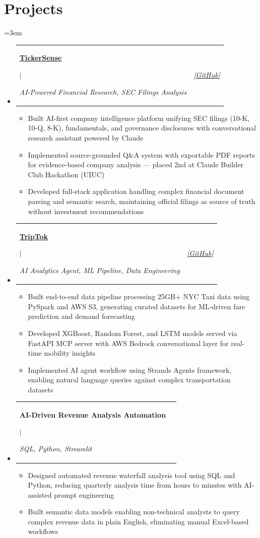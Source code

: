 \documentclass[letterpaper,11pt]{article}
\makeatletter
\newcommand{\resumeProjectHeading}[2]{
  \vspace{0pt}\item
    \begin{tabular*}{\textwidth}{l@{\extracolsep{\fill}}r}
      \textbf{#1}{ $|\$ \textit{#2}} & \\
    \end{tabular*}\vspace{-6pt}
}
\newcommand{\resumeProjectHeadingLinks}[4]{
  \vspace{0pt}\item
    \begin{tabular*}{\textwidth}{l@{\extracolsep{\fill}}r}
      \textbf{\href{\#1}{#2}}{ $|\$ \textit{#3}} & \href{\#4}{\textit{[GitHub]}} \\
    \end{tabular*}\vspace{-6pt}
}
\newcommand{\resumeSubHeadingListStart}{\begin{itemize}[leftmargin=0pt,label={},itemsep=-2pt]}
\newcommand{\resumeSubHeadingListEnd}{\end{itemize}}
\newcommand{\resumeItemListStart}{\begin{itemize}[leftmargin=12pt, nosep, topsep=2pt]}
\newcommand{\resumeItemListEnd}{\end{itemize}}
\renewcommand{\resumeProjectHeading}[2]{
  \vspace{0pt}\item
    \begin{tabular*}{\textwidth}{l@{\extracolsep{\fill}}r}
      \textbf{#1}{ $|$ \parbox[t]{0.82\textwidth}{\textit{#2}}} & \\
    \end{tabular*}\vspace{-6pt}
}
\renewcommand{\resumeProjectHeadingLinks}[4]{
  \vspace{0pt}\item
    \begin{tabular*}{\textwidth}{l@{\extracolsep{\fill}}r}
      \textbf{\href{#1}{#2}}{ $|$ \parbox[t]{0.78\textwidth}{\textit{#3}}} & \href{#4}{\textit{[GitHub]}} \\
    \end{tabular*}\vspace{-6pt}
}
\makeatother
\begin{document}
\section{Projects}
\begingroup\sloppy\emergencystretch=3em

  \resumeSubHeadingListStart
    \resumeProjectHeadingLinks
      {https://project-tickersense.vercel.app/}{TickerSense}
      {AI-Powered Financial Research, SEC Filings Analysis}
      {https://github.com/pratyushagarwal22/tickersense}
      \resumeItemListStart
        \item {Built AI-first company intelligence platform unifying SEC filings (10-K, 10-Q, 8-K), fundamentals, and governance disclosures with conversational research assistant powered by Claude}
        \item {Implemented source-grounded Q\&A system with exportable PDF reports for evidence-based company analysis — placed 2nd at Claude Builder Club Hackathon (UIUC)}
        \item {Developed full-stack application handling complex financial document parsing and semantic search, maintaining official filings as source of truth without investment recommendations}
      \resumeItemListEnd

    \resumeProjectHeadingLinks
      {https://github.com/pratyushagarwal22/TripTok}{TripTok}
      {AI Analytics Agent, ML Pipeline, Data Engineering}
      {https://github.com/pratyushagarwal22/TripTok}
      \resumeItemListStart
        \item {Built end-to-end data pipeline processing 25GB+ NYC Taxi data using PySpark and AWS S3, generating curated datasets for ML-driven fare prediction and demand forecasting}
        \item {Developed XGBoost, Random Forest, and LSTM models served via FastAPI MCP server with AWS Bedrock conversational layer for real-time mobility insights}
        \item {Implemented AI agent workflow using Strands Agents framework, enabling natural language queries against complex transportation datasets}
      \resumeItemListEnd

    \resumeProjectHeading
      {AI-Driven Revenue Analysis Automation}{SQL, Python, Streamlit}
      \resumeItemListStart
        \item {Designed automated revenue waterfall analysis tool using SQL and Python, reducing quarterly analysis time from hours to minutes with AI-assisted prompt engineering}
        \item {Built semantic data models enabling non-technical analysts to query complex revenue data in plain English, eliminating manual Excel-based workflows}
      \resumeItemListEnd
  \resumeSubHeadingListEnd
\end{document}
